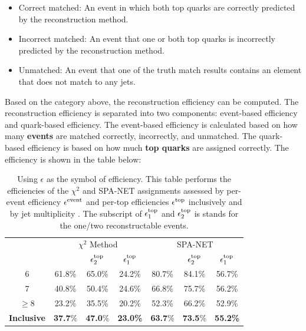 \begin{itemize}
	\item Correct matched: An event in which both top quarks are correctly predicted by the reconstruction method.
	\item Incorrect matched: An event that one or both top quarks is incorrectly predicted by the reconstruction method.
	\item Unmatched: An event that one of the truth match results contains an element that does not match to any jets.
\end{itemize}
Based on the category above, the reconstruction efficiency can be computed. The reconstruction efficiency is separated into two components: event-based efficiency and quark-based efficiency. The event-based efficiency is calculated based on how many \textbf{events} are matched correctly, incorrectly, and unmatched. The quark-based efficiency is based on how much \textbf{top quarks} are assigned correctly. The efficiency is shown in the table below:
\\
\begin{table}[H]
	\caption{Using $\epsilon$ as the symbol of efficiency. This table performs the efficiencies of the $\chi^2$ and SPA-NET assignments assessed by per-event efficiency $\epsilon^{\rm event}$ and per-top efficiencies $\epsilon^{\rm top}$ inclusively and by jet multiplicity \Njets. The subscript of $\epsilon^{\rm top}_{1}$ and $\epsilon^{\rm top}_{2}$ is stands for the one/two reconstructable events.}
	\centering
	\begin{tabular}{c c  c  c  c c  c}
		\hline
		\hline
		& \multicolumn{3}{c}{$\chi^2$ Method} & \multicolumn{3}{c}{SPA-NET }\\
		\hspace{0.2cm}\Njets & \hspace{0.15cm} \epsevent & $\epsilon^\mathrm{top}_2$ & \hspace{0.15cm} $\epsilon^\mathrm{top}_1$ \hspace{0.15cm} & \hspace{0.15cm} \epsevent & $\epsilon^\mathrm{top}_2$ & \hspace{0.15cm} $\epsilon^\mathrm{top}_1$ \hspace{0.15cm}   \\
		\midrule
		6          & 61.8\% & 65.0\% & 24.2\% & 80.7\% & 84.1\% & 56.7\% \\
		7          & 40.8\% & 50.4\% & 24.6\% & 66.8\% & 75.7\% & 56.2\% \\
		$\geq$8    & 23.2\% & 35.5\% & 20.2\% & 52.3\% & 66.2\% & 52.9\% \\
		\midrule     
		\vspace{0.2cm}
		\textbf{Inclusive}  &\textbf{ 37.7}\% & \textbf{47.0}\% & \textbf{23.0\%} & \textbf{63.7}\% &\textbf{73.5}\% &\textbf{55.2\%} \\
		\hline
	\end{tabular}
	\label{tab:eps}
\end{table}
